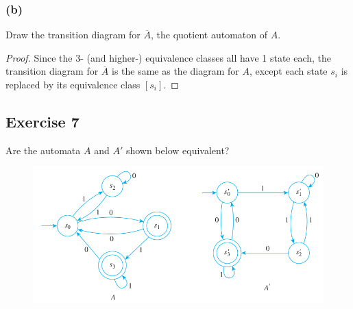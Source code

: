 \documentclass[14pt]{extarticle}
\begin{document}
\subsubsection{(b)}
Draw the transition diagram for \(\overline{A}\), the quotient automaton of \(A\).

\begin{proof}
Since the 3- (and higher-) equivalence classes all have 1 state each, the transition diagram for \(\overline{A}\) is the 
same as the diagram for \(A\), except each state \(s_i\) is replaced by its equivalence class \([s_i]\).
\end{proof}

\subsection{Exercise 7}
Are the automata \(A\) and \(A'\) shown below equivalent?

\begin{figure}[ht!]
\centering
\includegraphics[scale=0.5]{../images/12.3.7.png}
\end{figure}
\end{document}
